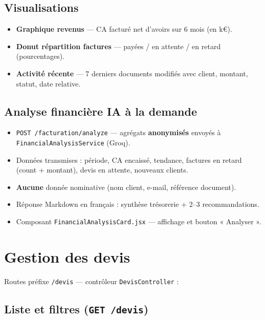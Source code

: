 \documentclass[11pt,a4paper]{report}
\newcommand{\route}[1]{\texttt{\small #1}}
\newcommand{\ctrl}[1]{\texttt{\small #1}}
\newcommand{\svc}[1]{\texttt{\small #1}}
\newcommand{\feat}[1]{\textbf{#1}}
\begin{document}
\subsection{Visualisations}

\begin{itemize}[leftmargin=*]
    \item \feat{Graphique revenus} — CA facturé net d'avoirs sur 6 mois (en k€).
    \item \feat{Donut répartition factures} — payées / en attente / en retard (pourcentages).
    \item \feat{Activité récente} — 7 derniers documents modifiés avec client, montant, statut, date relative.
\end{itemize}

\subsection{Analyse financière IA à la demande}

\begin{itemize}[leftmargin=*]
    \item \route{POST /facturation/analyze} — agrégats \textbf{anonymisés} envoyés à \svc{FinancialAnalysisService} (Groq).
    \item Données transmises : période, CA encaissé, tendance, factures en retard (count + montant), devis en attente, nouveaux clients.
    \item \textbf{Aucune} donnée nominative (nom client, e-mail, référence document).
    \item Réponse Markdown en français : synthèse trésorerie + 2--3 recommandations.
    \item Composant \texttt{FinancialAnalysisCard.jsx} — affichage et bouton « Analyser ».
\end{itemize}

\section{Gestion des devis}

Routes préfixe \route{/devis} — contrôleur \ctrl{DevisController} :

\subsection{Liste et filtres (\route{GET /devis})}
\end{document}
